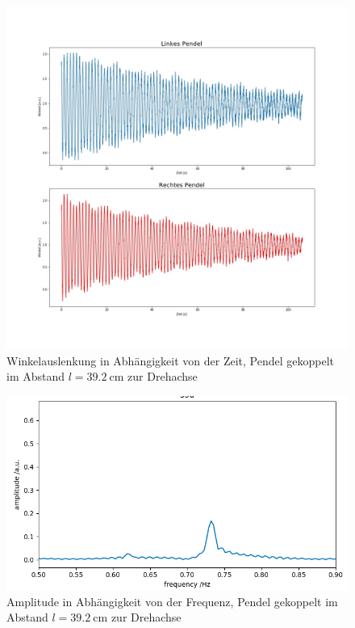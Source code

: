 \begin{figure}[H]
	\centering
	\includegraphics[height = 0.5 \textheight]{figures/211-15.jpeg}
	\caption{Winkelauslenkung in Abhängigkeit von der Zeit, Pendel gekoppelt im Abstand $l = \SI{39,2}{\cm}$ zur Drehachse}
\end{figure}
\begin{figure}[H]
	\centering
	\includegraphics[height = 0.23 \textheight]{figures/211-16.jpeg}
	\caption{Amplitude in Abhängigkeit von der Frequenz, Pendel gekoppelt im Abstand $l = \SI{39,2}{\cm}$ zur Drehachse}
\end{figure}


